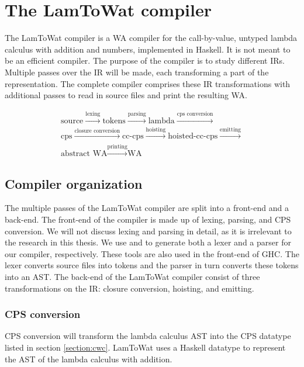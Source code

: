 
\chapter{\label{chap:compiler}The LamToWat compiler}
The LamToWat compiler is a \ac{WA} compiler for the call-by-value, untyped lambda calculus with addition and numbers, implemented in Haskell. It is not meant to be an efficient compiler. The purpose of the compiler is to study different \acp{IR}. Multiple passes over the \ac{IR} will be made, each transforming a part of the representation. The complete compiler comprises these \ac{IR} transformations with additional passes to read in source files and print the resulting \ac{WA}.

\begin{gather*}
  \mbox{source} \xrightarrow{\mbox{lexing}} \mbox{tokens} \xrightarrow{\mbox{parsing}} \mbox{lambda} \xrightarrow{\mbox{cps conversion}} \\
  \mbox{cps} \xrightarrow{\mbox{closure conversion}} \mbox{cc-cps} \xrightarrow{\mbox{hoisting}} \mbox{hoisted-cc-cps} \xrightarrow{\mbox{emitting}} \\
  \mbox{abstract WA} \xrightarrow{\mbox{printing}} \mbox{WA}
\end{gather*}


\section{\label{section:comporg}Compiler organization}
The multiple passes of the LamToWat compiler are split into a front-end and a back-end. The front-end of the compiler is made up of lexing, parsing, and \ac{CPS} conversion. We will not discuss lexing and parsing in detail, as it is irrelevant to the research in this thesis. We use \autocite{haskellalex} and \autocite{haskellhappy} to generate both a lexer and a parser for our compiler, respectively. These tools are also used in the front-end of \ac{GHC}. The lexer converts source files into tokens and the parser in turn converts these tokens into an \ac{AST}. The back-end of the LamToWat compiler consist of three transformations on the \ac{IR}: closure conversion, hoisting, and emitting.

\subsection{\label{section:cpsconvert}CPS conversion}
\ac{CPS} conversion will transform the lambda calculus \ac{AST} into the \ac{CPS} datatype listed in section \ref{section:cwc}. LamToWat uses a Haskell datatype to represent the \ac{AST} of the lambda calculus with addition. 

